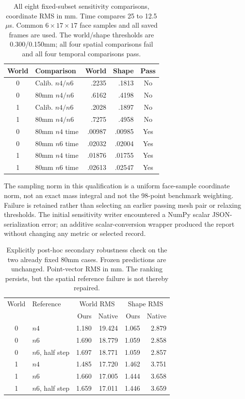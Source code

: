 \documentclass[10pt,twocolumn,letterpaper]{article}
\begin{document}
\begin{table}[t]
\centering\small
\begin{tabular}{clrrc}
\toprule
World & Comparison & World & Shape & Pass\\
\midrule
0&Calib. $n4/n6$ &.2235&.1813&No\\
0&80mm $n4/n6$ &.6162&.4198&No\\
1&Calib. $n4/n6$ &.2028&.1897&No\\
1&80mm $n4/n6$ &.7275&.4958&No\\
0&80mm $n4$ time &.00987&.00985&Yes\\
0&80mm $n6$ time &.02032&.02004&Yes\\
1&80mm $n4$ time &.01876&.01755&Yes\\
1&80mm $n6$ time &.02613&.02547&Yes\\
\bottomrule
\end{tabular}
\caption{All eight fixed-subset sensitivity comparisons, coordinate RMS in mm. Time compares 25 to 12.5$\mu$s. Common $6\times17\times17$ face samples and all saved frames are used. The world/shape thresholds are 0.300/0.150mm; all four spatial comparisons fail and all four temporal comparisons pass.}
\end{table}
The sampling norm in this qualification is a uniform face-sample coordinate norm, not an exact mass integral and not the 98-point benchmark weighting. Failure is retained rather than selecting an earlier passing mesh pair or relaxing thresholds. The initial sensitivity writer encountered a NumPy scalar JSON-serialization error; an additive scalar-conversion wrapper produced the report without changing any metric or selected record.

\begin{table}[t]
\centering\small
\begin{tabular}{clrrrr}
\toprule
World& Reference &\multicolumn{2}{c}{World RMS}&\multicolumn{2}{c}{Shape RMS}\\
&&Ours&Native&Ours&Native\\
\midrule
0&$n4$&1.180&19.424&1.065&2.879\\
0&$n6$&1.690&18.779&1.059&2.858\\
0&$n6$, half step&1.697&18.771&1.059&2.857\\
1&$n4$&1.485&17.720&1.462&3.751\\
1&$n6$&1.660&17.005&1.444&3.658\\
1&$n6$, half step&1.659&17.011&1.446&3.659\\
\bottomrule
\end{tabular}
\caption{Explicitly post-hoc secondary robustness check on the two already fixed 80mm cases. Frozen predictions are unchanged. Point-vector RMS in mm. The ranking persists, but the spatial reference failure is not thereby repaired.}
\end{table}
\end{document}
